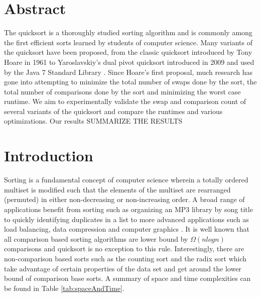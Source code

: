 %


\section{Abstract}
    The quicksort is a thoroughly studied sorting algorithm and is commonly among the first efficient sorts learned by students of computer science. Many variants of the quicksort have been proposed, from the classic quicksort introduced by Tony Hoare in 1961 \cite{Hoare01011962} to Yaroslavskiy’s dual pivot quicksort introduced in 2009 and used by the Java 7 Standard Library \cite{kushagra2013multi}. Since Hoare’s first proposal, much research has gone into attempting to minimize the total number of swaps done by the sort, the total number of comparisons done by the sort and minimizing the worst case runtime. We aim to experimentally validate the swap and comparison count of several variants of the quicksort and compare the runtimes and various optimizations. Our results SUMMARIZE THE RESULTS

\section{Introduction}
    Sorting is a fundamental concept of computer science wherein a totally ordered multiset is modified such that the elements of the multiset are rearranged (permuted) in either non-decreasing or non-increasing order. A broad range of applications benefit from sorting such as organizing an MP3 library by song title to quickly identifying duplicates in a list to more advanced applications such as load balancing, data compression and computer graphics \cite{sortingSlides}. It is well known that all comparison based sorting algorithms are lower bound by $\Omega(n log n)$ comparisons \cite{Cormen:2001:IA:580470} and quicksort is no exception to this rule. Interestingly, there are non-comparison based sorts such as the counting sort and the radix sort which take advantage of certain properties of the data set and get around the lower bound of comparison base sorts. A summary of space and time complexities can be found in Table \ref{tab:spaceAndTime}.
    
